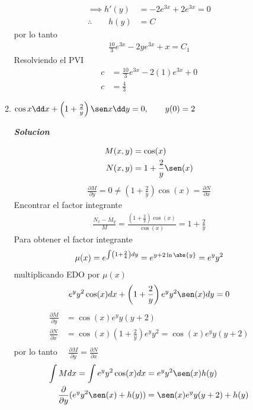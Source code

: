 \begin{enumerate}
\begin{enumerate}
\begin{align*}
    \implies h'(y) & = -2e^{3x} + 2e^{3x} =0\\
    \therefore \qquad h(y)& = C
\end{align*}
por lo tanto
\begin{align*}
    \frac{10}{3} e^{3x}  - 2ye^{3x} + x = C_{1} 
\end{align*}
Resolviendo el PVI 
\begin{align*}
    c &= \frac{10}{3} e^{3x} -2(1)e^{3x} +0 \\ 
    c &= \frac{4}{3}
\end{align*}
    \item $\cos x \dd x+ \left( 1 + \frac{2}{y} \right) \sen x \dd y=0, \qquad y(0)=2$
    
\textit{ \textbf{Solucion}}
    
\begin{align*}
        M(x,y)&=\cos(x) \\
        N(x,y)&=1+\frac{2}{y} \sen(x) 
\end{align*}
\begin{align*}
    \frac{\partial M}{\partial y} = 0 \neq \left( 1+\frac{2}{y}\right) \cos (x) = \frac{\partial N}{\partial x}
\end{align*}
Encontrar el factor integrante
\begin{align*}
\frac{N_{x}-M_{y}}{M} = \frac{\left( 1+\frac{2}{y}\right) \cos (x)}{\cos(x)}=1 +\frac{2}{y}
\end{align*}
Para obtener el factor integrante
\begin{align*}
    \mu(x) = e^{\int \left( 1 + \frac{2}{4}\right)dy}=e^{y+2\ln\abs{y}} = e^{y}y^{2}
\end{align*}
multiplicando EDO por $\mu(x)$
\begin{align*}
    e^{y}y^{2} \cos(x)dx + \left( 1+\frac{2}{y} \right) e^{y}y^{2}\sen(x)dy = 0
\end{align*}
\begin{align*}
    \frac{\partial M}{\partial y} &= \cos (x) e^{y}y(y+2)\\
    \frac{\partial N}{\partial x} &= \cos (x)\left( 1+\frac{2}{y} \right) e^{y}y^{2}= \cos(x)e^{y}y(y+2)\\
\end{align*}
por lo tanto $\quad \displaystyle \frac{\partial M}{\partial y} = \frac{\partial N}{\partial x} $
\begin{align*}
    \int M dx =\int e^{y}y^{2}\cos(x)dx&=e^{y}y^{2}\sen(x)h(y)\\
    \frac{\partial}{\partial y} (e^{y}y^{2}\sen(x)+h(y)) & = \sen(x)e^{y}y(y+2)+h(y)

\end{align*}
\end{enumerate}
\end{enumerate}
